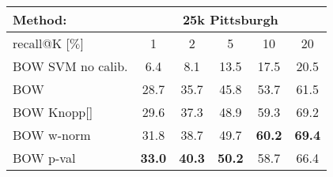 
	\begin{tabularx}{0.915\linewidth}{|l|c c c c c|}
		\hline 
		\rowcolor{maroon!50}
		Method: & \multicolumn{5}{c|}{25k Pittsburgh} \\
		\hline 
		\hline 
		\rowcolor{maroon!50}
		recall@K [$\%$] & 1 & 2 & 5 & 10 & 20 \\
		\hline
		\rowcolor{maroon!10}
      \rowcolor{maroon!10}
    BOW SVM no calib.   & 6.4   & 8.1   & 13.5  & 17.5  & 20.5 \\
		  \rowcolor{maroon!10}
    BOW           & 28.7  & 35.7  & 45.8 & 53.7   & 61.5 \\
      \rowcolor{maroon!10}
    
    \textcolor{petr}{BOW  Knopp[]}  & \textcolor{petr}{29.6}  & \textcolor{petr}{37.3}  & \textcolor{petr}{48.9} & \textcolor{petr}{59.3}   & \textcolor{petr}{69.2}  \\
      \rowcolor{maroon!10}
		BOW w-norm  & 31.8    & 38.7  & 49.7  & \textbf{60.2}  & \textbf{69.4} \\
      \rowcolor{maroon!10}
    BOW p-val     & \textbf{33.0}  & \textbf{40.3}  & \textbf{50.2} & 58.7   &  66.4 \\
    \hline

\end{tabularx}
